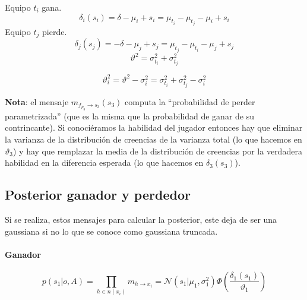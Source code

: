 \documentclass[11pt,twoside,spanish]{report} %
\begin{document}
Equipo $t_i$ gana.
\begin{equation}
	\delta_i(s_i) = \delta -\mu_i+s_i =\mu_{t_i} - \mu_{t_j}-\mu_i+s_i
\end{equation}
Equipo $t_j$ pierde.
\begin{equation}
	\delta_j(s_j) = -\delta -\mu_j+s_j = \mu_{t_j}-\mu_{t_i}-\mu_j+s_j
\end{equation}
\begin{equation}
	\vartheta^2 = \sigma_{t_i}^2 + \sigma_{t_j}^2
\end{equation}

\begin{equation}
	\vartheta_i^2 = \vartheta^2 - \sigma_i^2 = \sigma_{t_i}^2 + \sigma_{t_j}^2 - \sigma_i^2
\end{equation}


\textbf{Nota}: el mensaje $m_{f_{p_3} \rightarrow s_3}(s_3)$ computa la ``probabilidad de perder parametrizada'' (que es la misma que la probabilidad de ganar de su contrincante). Si conoci\'eramos la habilidad del jugador entonces hay que eliminar la varianza de la distribuci\'on de creencias de la varianza total (lo que hacemos en $\vartheta_3$) y hay que remplazar la media de la distribuci\'on de creencias por la verdadera habilidad en la diferencia esperada (lo que hacemos en $\delta_3(s_3)$).







\subsection{Posterior ganador y perdedor}
\label{appendix:trunc}
Si se realiza, estos mensajes para calcular la posterior, este deja de ser una gaussiana si no lo que se conoce como gaussiana truncada.

\paragraph{Ganador}
\begin{equation}\label{eq:posterior_ganador}
	p(s_1|o,A) = \prod_{h \in n(x_i)} m_{h \rightarrow x_i} =  \mathcal{N}(s_1| \mu_1, \sigma_1^2)  \Phi\left(\frac{\delta_1(s_1)}{\vartheta_1}\right)
\end{equation}
\end{document}
